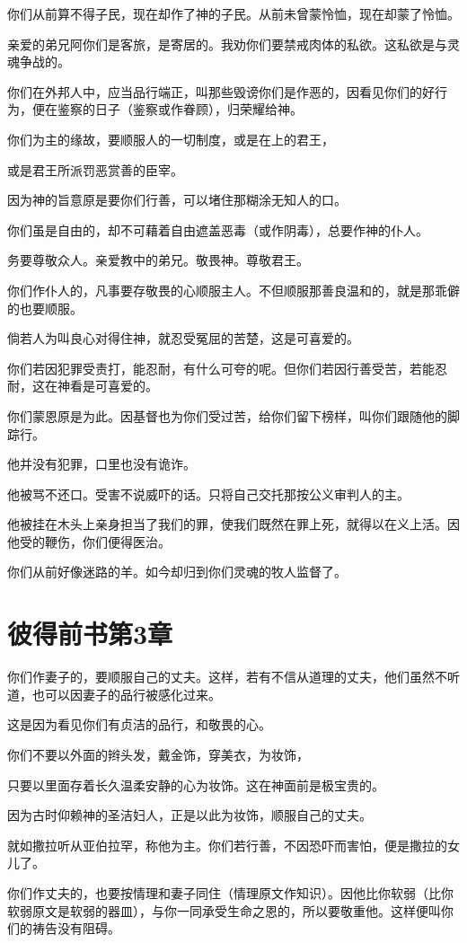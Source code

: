 \documentclass[12pt,oneside]{book}
\begin{document}
你们从前算不得子民，现在却作了神的子民。从前未曾蒙怜恤，现在却蒙了怜恤。

亲爱的弟兄阿你们是客旅，是寄居的。我劝你们要禁戒肉体的私欲。这私欲是与灵魂争战的。

你们在外邦人中，应当品行端正，叫那些毁谤你们是作恶的，因看见你们的好行为，便在鉴察的日子（鉴察或作眷顾），归荣耀给神。

你们为主的缘故，要顺服人的一切制度，或是在上的君王，

或是君王所派罚恶赏善的臣宰。

因为神的旨意原是要你们行善，可以堵住那糊涂无知人的口。

你们虽是自由的，却不可藉着自由遮盖恶毒（或作阴毒），总要作神的仆人。

务要尊敬众人。亲爱教中的弟兄。敬畏神。尊敬君王。

你们作仆人的，凡事要存敬畏的心顺服主人。不但顺服那善良温和的，就是那乖僻的也要顺服。

倘若人为叫良心对得住神，就忍受冤屈的苦楚，这是可喜爱的。

你们若因犯罪受责打，能忍耐，有什么可夸的呢。但你们若因行善受苦，若能忍耐，这在神看是可喜爱的。

你们蒙恩原是为此。因基督也为你们受过苦，给你们留下榜样，叫你们跟随他的脚踪行。

他并没有犯罪，口里也没有诡诈。

他被骂不还口。受害不说威吓的话。只将自己交托那按公义审判人的主。

他被挂在木头上亲身担当了我们的罪，使我们既然在罪上死，就得以在义上活。因他受的鞭伤，你们便得医治。

你们从前好像迷路的羊。如今却归到你们灵魂的牧人监督了。

\chapter{彼得前书第3章}
你们作妻子的，要顺服自己的丈夫。这样，若有不信从道理的丈夫，他们虽然不听道，也可以因妻子的品行被感化过来。

这是因为看见你们有贞洁的品行，和敬畏的心。

你们不要以外面的辫头发，戴金饰，穿美衣，为妆饰，

只要以里面存着长久温柔安静的心为妆饰。这在神面前是极宝贵的。

因为古时仰赖神的圣洁妇人，正是以此为妆饰，顺服自己的丈夫。

就如撒拉听从亚伯拉罕，称他为主。你们若行善，不因恐吓而害怕，便是撒拉的女儿了。

你们作丈夫的，也要按情理和妻子同住（情理原文作知识）。因他比你软弱（比你软弱原文是软弱的器皿），与你一同承受生命之恩的，所以要敬重他。这样便叫你们的祷告没有阻碍。
\end{document}
